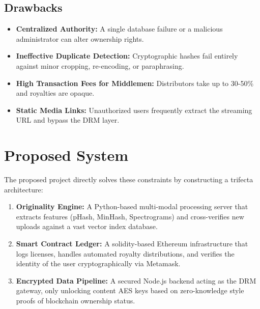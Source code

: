 \documentclass[12pt,a4paper]{report}
\begin{document}
\subsection{Drawbacks}
\begin{itemize}
    \item \textbf{Centralized Authority:} A single database failure or a malicious administrator can alter ownership rights.
    \item \textbf{Ineffective Duplicate Detection:} Cryptographic hashes fail entirely against minor cropping, re-encoding, or paraphrasing.
    \item \textbf{High Transaction Fees for Middlemen:} Distributors take up to 30-50\% and royalties are opaque.
    \item \textbf{Static Media Links:} Unauthorized users frequently extract the streaming URL and bypass the DRM layer.
\end{itemize}

\section{Proposed System}
The proposed project directly solves these constraints by constructing a trifecta architecture:
\begin{enumerate}
    \item \textbf{Originality Engine:} A Python-based multi-modal processing server that extracts features (pHash, MinHash, Spectrograms) and cross-verifies new uploads against a vast vector index database.
    \item \textbf{Smart Contract Ledger:} A solidity-based Ethereum infrastructure that logs licenses, handles automated royalty distributions, and verifies the identity of the user cryptographically via Metamask.
    \item \textbf{Encrypted Data Pipeline:} A secured Node.js backend acting as the DRM gateway, only unlocking content AES keys based on zero-knowledge style proofs of blockchain ownership status.
\end{enumerate}
\end{document}
